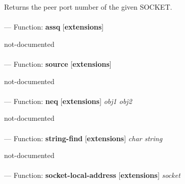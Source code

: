 \begin{adjustwidth}{5em}{5em}
Returns the peer port number of the given SOCKET.
\end{adjustwidth}

\paragraph{}
\label{EXTENSIONS:ASSQ}
--- Function: \textbf{assq} [\textbf{extensions}] \textit{}

\begin{adjustwidth}{5em}{5em}
not-documented
\end{adjustwidth}

\paragraph{}
\label{EXTENSIONS:SOURCE}
--- Function: \textbf{source} [\textbf{extensions}] \textit{}

\begin{adjustwidth}{5em}{5em}
not-documented
\end{adjustwidth}

\paragraph{}
\label{EXTENSIONS:NEQ}
--- Function: \textbf{neq} [\textbf{extensions}] \textit{obj1 obj2}

\begin{adjustwidth}{5em}{5em}
not-documented
\end{adjustwidth}

\paragraph{}
\label{EXTENSIONS:STRING-FIND}
--- Function: \textbf{string-find} [\textbf{extensions}] \textit{char string}

\begin{adjustwidth}{5em}{5em}
not-documented
\end{adjustwidth}

\paragraph{}
\label{EXTENSIONS:SOCKET-LOCAL-ADDRESS}
--- Function: \textbf{socket-local-address} [\textbf{extensions}] \textit{socket}

